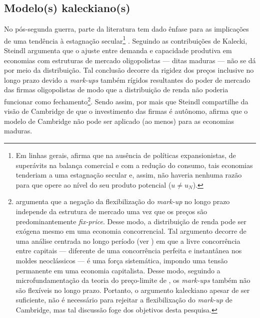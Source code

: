 \subsection{Modelo(s) kaleckiano(s)}
\label{Sec_Kaleckiano}

No pós-segunda guerra, parte da literatura tem dado ênfase para 
as implicações de uma tendência à estagnação secular\footnote{Em linhas gerais, \textcite{steindl_stagnation_1979} afirma que na ausência de políticas expansionistas, de superávits na balança comercial e com a redução do consumo,  tais economias tenderiam a uma estagnação secular e, assim,  não haveria nenhuma razão para que opere ao nível do seu produto potencial ($u \neq u_N$).} \cite{setterfield_distribution_2002}.
Seguindo as contribuições de Kalecki, Steindl argumenta que o ajuste entre demanda e capacidade produtiva em economias com  estruturas de mercado oligopolistas --- ditas maduras --- não se dá por meio da distribuição.
Tal conclusão decorre da rigidez dos preços inclusive no longo prazo devido a \textit{mark-ups} também rígidos resultantes do poder de mercado das firmas oligopolistas de modo que a distribuição de renda não poderia funcionar como fechamento\footnote{
	\textcite{serrano_sraffian_1995} argumenta que a negação da flexibilização do \textit{mark-up} no longo prazo independe da estrutura de mercado uma vez que os preços são predominantemente \textit{fix-price}. Desse modo, a distribuição de renda pode ser exógena mesmo em uma economia concorrencial. Tal argumento decorre de uma análise centrada no longo período (ver \textcite{milgate_capital_1982}) em que a livre concorrência entre capitais --- diferente de uma concorrência perfeita e instantânea nos moldes neoclássicos ---  é uma força sistemática, impondo uma tensão permanente em uma economia capitalista. 
	Desse modo, seguindo a microfundamentação da teoria do preço-limite de \textcite{labini}, os \textit{mark-ups} também não são flexíveis no longo prazo.
	Portanto, o argumento kaleckiano apesar de ser suficiente,  não é necessário para  rejeitar a flexibilixação do \textit{mark-up} de Cambridge, mas tal discussão foge dos objetivos desta pesquisa.
}.
Sendo assim, por mais que Steindl compartilhe da visão de Cambridge de que o investimento das firmas é autônomo, afirma que o modelo de Cambridge não pode ser aplicado (ao menos) para as economias maduras.  


